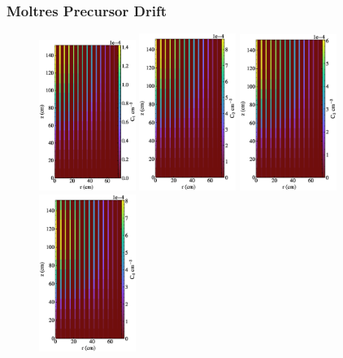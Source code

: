 \begin{frame}
        \frametitle{Moltres Precursor Drift}
  \begin{figure}
   \vspace{-0.1in}
   \includegraphics[width=0.28\textwidth]{./images/auto_diff_rho_pre1.eps}
   \includegraphics[width=0.28\textwidth]{./images/auto_diff_rho_pre2.eps}
   \includegraphics[width=0.28\textwidth]{./images/auto_diff_rho_pre3.eps}
   \includegraphics[width=0.28\textwidth]{./images/auto_diff_rho_pre4.eps}

\end{figure}
\end{frame}
